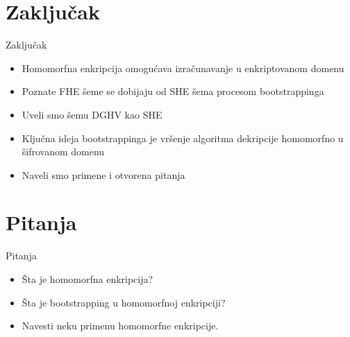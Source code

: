 \documentclass[aspectratio=1610]{beamer}
\begin{document}
\section{Zaklju\v cak}
\begin{frame}{Zaklju\v cak}
\begin{itemize}
    \item Homomorfna enkripcija omogu\' cava izra\v cunavanje u enkriptovanom domenu
    \item Poznate FHE \v seme se dobijaju od SHE \v sema procesom bootstrappinga
    \item Uveli smo \v semu DGHV kao SHE
    \item Klju\v cna ideja bootstrappinga je vr\v senje algoritma dekripcije homomorfno u \v sifrovanom domenu
    \item Naveli smo primene i otvorena pitanja
\end{itemize}
\end{frame}

\section{Pitanja}
\begin{frame}{Pitanja}
\begin{itemize}
    \item \v Sta je homomorfna enkripcija?
    \item \v Sta je bootstrapping u homomorfnoj enkripciji?
    \item Navesti neku primenu homomorfne enkripcije.
\end{itemize}
\end{frame}

\end{document}

